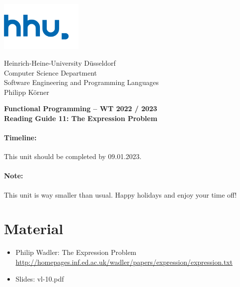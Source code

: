 \documentclass[11pt,a4paper]{article}
\begin{document}
\begin{minipage}[b]{\textwidth}
	\parbox[t]{5cm}{%
		\includegraphics[width=4cm]{unilogo}
		\hfill
	}
	\parbox[b]{11cm}{%
		Heinrich-Heine-University D\"usseldorf\\
		Computer Science Department\\
		Software Engineering and Programming Languages\\
		Philipp K\"orner
	}
\end{minipage}
\begin{center}
	\bf
	Functional Programming -- WT 2022 / 2023\\
	Reading Guide 11: The Expression Problem
\end{center}

\pagestyle{empty}

\paragraph{Timeline:} This unit should be completed by 09.01.2023.

\paragraph{Note:} This unit is way smaller than usual. Happy holidays and enjoy your time off!

\section{Material} 

\begin{itemize}
\item Philip Wadler: The Expression Problem \url{http://homepages.inf.ed.ac.uk/wadler/papers/expression/expression.txt}
\item Slides: vl-10.pdf 
\end{itemize}
\end{document}
